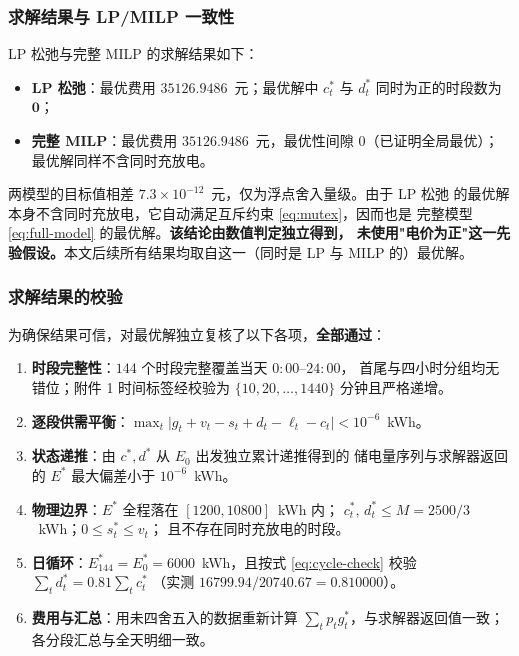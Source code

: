 \documentclass[withoutpreface,bwprint]{cumcmthesis}
\begin{document}
\subsubsection{求解结果与 LP/MILP 一致性}

LP 松弛与完整 MILP 的求解结果如下：

\begin{itemize}
  \item \textbf{LP 松弛}：最优费用 $35126.9486$~元；最优解中
        $c_t^*$ 与 $d_t^*$ 同时为正的时段数为 $\mathbf{0}$；
  \item \textbf{完整 MILP}：最优费用 $35126.9486$~元，最优性间隙
        $0$（已证明全局最优）；最优解同样不含同时充放电。
\end{itemize}

两模型的目标值相差 $7.3\times10^{-12}$~元，仅为浮点舍入量级。由于 LP 松弛
的最优解本身不含同时充放电，它自动满足互斥约束 \eqref{eq:mutex}，因而也是
完整模型 \eqref{eq:full-model} 的最优解。\textbf{该结论由数值判定独立得到，
未使用"电价为正"这一先验假设。}本文后续所有结果均取自这一（同时是 LP 与
MILP 的）最优解。

\subsubsection{求解结果的校验}

为确保结果可信，对最优解独立复核了以下各项，\textbf{全部通过}：

\begin{enumerate}
  \item \textbf{时段完整性}：$144$ 个时段完整覆盖当天 $0{:}00$--$24{:}00$，
        首尾与四小时分组均无错位；附件 1 时间标签经校验为
        $\{10,20,\dots,1440\}$ 分钟且严格递增。
  \item \textbf{逐段供需平衡}：$\max_t\bigl|g_t+v_t-s_t+d_t-\ell_t-c_t\bigr|
        < 10^{-6}$~kWh。
  \item \textbf{状态递推}：由 $c^*,d^*$ 从 $E_0$ 出发独立累计递推得到的
        储电量序列与求解器返回的 $E^*$ 最大偏差小于 $10^{-6}$~kWh。
  \item \textbf{物理边界}：$E^*$ 全程落在 $[1200,10800]$~kWh 内；
        $c_t^*,\,d_t^* \le M = 2500/3$~kWh；$0 \le s_t^* \le v_t$；
        且不存在同时充放电的时段。
  \item \textbf{日循环}：$E_{144}^* = E_0^* = 6000$~kWh，且按式
        \eqref{eq:cycle-check} 校验 $\sum_t d_t^* = 0.81\sum_t c_t^*$
        （实测 $16799.94 / 20740.67 = 0.810000$）。
  \item \textbf{费用与汇总}：用未四舍五入的数据重新计算
        $\sum_t p_t g_t^*$，与求解器返回值一致；各分段汇总与全天明细一致。
\end{enumerate}
\end{document}
